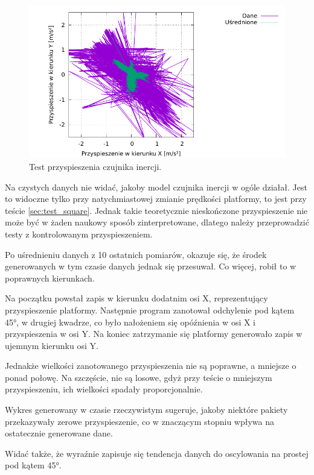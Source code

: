 		\begin{figure}[H]
		\centering
			\includegraphics[width=\textwidth]{plots/wewucho_linear.pdf}
			\caption{Test przyspieszenia czujnika inercji.}
			\label{plot:wewucho_angular}
		\end{figure}
		
		Na czystych danych nie widać, jakoby model czujnika inercji w ogóle działał. 
		Jest to widoczne tylko przy natychmiastowej zmianie prędkości platformy, to jest przy teście \ref{sec:test_square}.
		Jednak takie teoretycznie nieskończone przyspieszenie nie może być w żaden naukowy sposób zinterpretowane, dlatego należy przeprowadzić testy z kontrolowanym
		przyspieszeniem.
		
		Po uśrednieniu danych z 10 ostatnich pomiarów, okazuje się, że środek generowanych w tym czasie danych jednak się przesuwał.
		Co więcej, robił to w poprawnych kierunkach.
		
		Na początku powstał zapis w kierunku dodatnim osi X, reprezentujący przyspieszenie platformy.
		Następnie program zanotował odchylenie pod kątem 45°, w drugiej kwadrze, co było nałożeniem się opóźnienia w osi X i przyspieszenia w osi Y.
		Na koniec zatrzymanie się platformy generowało zapis w ujemnym kierunku osi Y.
		
		Jednakże wielkości zanotowanego przyspieszenia nie są poprawne, a mniejsze o ponad połowę.
		Na szczęście, nie są losowe, gdyż przy teście o mniejszym przyspieszeniu, ich wielkości spadały proporcjonalnie.
		
		Wykres generowany w czasie rzeczywistym sugeruje, jakoby niektóre pakiety przekazywały zerowe przyspieszenie, co w znaczącym stopniu wpływa na 
		ostatecznie generowane dane.
		
		Widać także, że wyraźnie zapisuje się tendencja danych do oscylowania na prostej pod kątem 45°.
		
		
		
		
		
	
	
